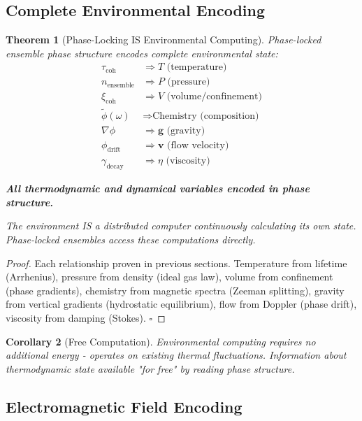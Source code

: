 \documentclass[11pt,a4paper]{article}
\newtheorem{theorem}{Theorem}[section]
\newtheorem{corollary}[theorem]{Corollary}
\theoremstyle{definition}
\theoremstyle{remark}
\begin{document}
\subsection{Complete Environmental Encoding}

\begin{theorem}[Phase-Locking IS Environmental Computing]
\label{thm:env_computing}
Phase-locked ensemble phase structure encodes complete environmental state:
\begin{align}
\tau_{\text{coh}} &\Rightarrow T \text{ (temperature)} \\
n_{\text{ensemble}} &\Rightarrow P \text{ (pressure)} \\
\xi_{\text{coh}} &\Rightarrow V \text{ (volume/confinement)} \\
\tilde{\phi}(\omega) &\Rightarrow \text{Chemistry (composition)} \\
\nabla\phi &\Rightarrow \mathbf{g} \text{ (gravity)} \\
\phi_{\text{drift}} &\Rightarrow \mathbf{v} \text{ (flow velocity)} \\
\gamma_{\text{decay}} &\Rightarrow \eta \text{ (viscosity)}
\end{align}

\textbf{All thermodynamic and dynamical variables encoded in phase structure.}

The environment IS a distributed computer continuously calculating its own state. Phase-locked ensembles access these computations directly.
\end{theorem}

\begin{proof}
Each relationship proven in previous sections. Temperature from lifetime (Arrhenius), pressure from density (ideal gas law), volume from confinement (phase gradients), chemistry from magnetic spectra (Zeeman splitting), gravity from vertical gradients (hydrostatic equilibrium), flow from Doppler (phase drift), viscosity from damping (Stokes). $\square$
\end{proof}

\begin{corollary}[Free Computation]
Environmental computing requires no additional energy - operates on existing thermal fluctuations. Information about thermodynamic state available "for free" by reading phase structure.
\end{corollary}

\subsection{Electromagnetic Field Encoding}
\end{document}
